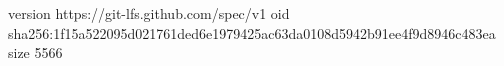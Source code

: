 version https://git-lfs.github.com/spec/v1
oid sha256:1f15a522095d021761ded6e1979425ac63da0108d5942b91ee4f9d8946c483ea
size 5566
